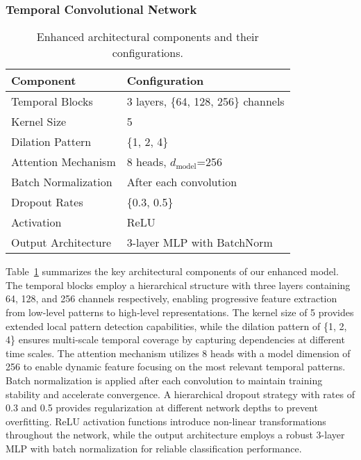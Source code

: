 \subsubsection{Temporal Convolutional Network}



\begin{table}[h!]
	\centering
	\renewcommand{\arraystretch}{1.4} %
	\setlength{\tabcolsep}{12pt}      %
	\caption{Enhanced architectural components and their configurations.}
	\label{tab:arch_components_enhanced}
	\begin{tabular}{ll}
		\toprule
		\textbf{Component} & \textbf{Configuration} \\
		\midrule
		Temporal Blocks & 3 layers, \{64, 128, 256\} channels \\
		Kernel Size & 5 \\
		Dilation Pattern & \{1, 2, 4\} \\
		Attention Mechanism & 8 heads, $d_{\text{model}}$=256 \\
		Batch Normalization & After each convolution \\
		Dropout Rates & \{0.3, 0.5\} \\
		Activation & ReLU \\
		Output Architecture & 3-layer MLP with BatchNorm \\
		\bottomrule
	\end{tabular}
\end{table}

Table~\ref{tab:arch_components_enhanced} summarizes the key architectural components of our enhanced model. The temporal blocks employ a hierarchical structure with three layers containing 64, 128, and 256 channels respectively, enabling progressive feature extraction from low-level patterns to high-level representations. The kernel size of 5 provides extended local pattern detection capabilities, while the dilation pattern of \{1, 2, 4\} ensures multi-scale temporal coverage by capturing dependencies at different time scales. The attention mechanism utilizes 8 heads with a model dimension of 256 to enable dynamic feature focusing on the most relevant temporal patterns. Batch normalization is applied after each convolution to maintain training stability and accelerate convergence. A hierarchical dropout strategy with rates of 0.3 and 0.5 provides regularization at different network depths to prevent overfitting. ReLU activation functions introduce non-linear transformations throughout the network, while the output architecture employs a robust 3-layer MLP with batch normalization for reliable classification performance. \\


